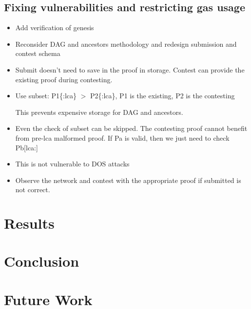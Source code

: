 \documentclass{article}
\begin{document}
  \subsection{Fixing vulnerabilities and restricting gas usage}

  \begin{itemize}

  \item
    Add verification of genesis
  \item
    Reconsider DAG and ancestors methodology and redesign submission and
    contest schema
  \item
    Submit doesn't need to save in the proof in storage. Contest can
    provide the existing proof during contesting.

  \item
    Use subset: P1\{:lca\} $>$ P2\{:lca\}, P1 is the existing, P2 is the
    contesting

    This prevents expensive storage for DAG and ancestors.

  \item
    Even the check of subset can be skipped. The contesting proof cannot
    benefit from pre-lca malformed proof. If Pa is valid, then we just
    need to check Pb[lca:]

  \item
    This is not vulnerable to DOS attacks

  \item
    Observe the network and contest with the appropriate proof if
    submitted is not correct.

  \end{itemize}

  \section{Results}

  \section{Conclusion}

  \section{Future Work}
\end{document}
